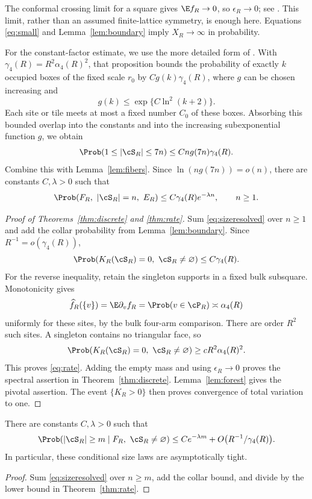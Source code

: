 The conformal crossing limit for a square gives $\E f_R\to0$, so $\epsilon_R\to0$; see \cite{Smirnov}. This limit, rather than an assumed finite-lattice symmetry, is enough here. Equations \eqref{eq:small} and Lemma~\ref{lem:boundary} imply $X_R\to\infty$ in probability.

For the constant-factor estimate, we use the more detailed form of \cite[Proposition~4.1]{GPS}. With $\gamma_4(R)=R^2\alpha_4(R)^2$, that proposition bounds the probability of exactly $k$ occupied boxes of the fixed scale $r_0$ by $C g(k)\gamma_4(R)$, where $g$ can be chosen increasing and
\[
 g(k)\le\exp\{C\ln^2(k+2)\}.
\]
Each site or tile meets at most a fixed number $C_0$ of these boxes. Absorbing this bounded overlap into the constants and into the increasing subexponential function $g$, we obtain
\begin{equation}\label{eq:gpssize}
 \Prob(1\le|\cS_R|\le7n)\le Cn g(7n)\gamma_4(R).
\end{equation}
Combine this with Lemma~\ref{lem:fibers}. Since $\ln(ng(7n))=o(n)$, there are constants $C,\lambda>0$ such that
\begin{equation}\label{eq:sizeresolved}
 \Prob(F_R,\ |\cS_R|=n,\ E_R)
 \le C\gamma_4(R)e^{-\lambda n},\qquad n\ge1.
\end{equation}

\begin{proof}[Proof of Theorems~\ref{thm:discrete} and \ref{thm:rate}]
Sum \eqref{eq:sizeresolved} over $n\ge1$ and add the collar probability from Lemma~\ref{lem:boundary}. Since $R^{-1}=o(\gamma_4(R))$,
\[
 \Prob(K_R(\cS_R)=0,\ \cS_R\ne\varnothing)\le C\gamma_4(R).
\]
For the reverse inequality, retain the singleton supports in a fixed bulk subsquare. Monotonicity gives
\[
 \widehat f_R(\{v\})=\E\partial_vf_R
 =\Prob(v\in\cP_R)\asymp\alpha_4(R)
\]
uniformly for these sites, by the bulk four-arm comparison. There are order $R^2$ such sites. A singleton contains no triangular face, so
\[
 \Prob(K_R(\cS_R)=0,\ \cS_R\ne\varnothing)
 \ge c R^2\alpha_4(R)^2.
\]
This proves \eqref{eq:rate}. Adding the empty mass and using $\epsilon_R\to0$ proves the spectral assertion in Theorem~\ref{thm:discrete}. Lemma~\ref{lem:forest} gives the pivotal assertion. The event $\{K_R>0\}$ then proves convergence of total variation to one.
\end{proof}

\begin{corollary}\label{cor:conditionalsize}
There are constants $C,\lambda>0$ such that
\[
 \Prob(|\cS_R|\ge m\mid F_R,\ \cS_R\ne\varnothing)
 \le C e^{-\lambda m}+O\bigl(R^{-1}/\gamma_4(R)\bigr).
\]
In particular, these conditional size laws are asymptotically tight.
\end{corollary}
\begin{proof}
Sum \eqref{eq:sizeresolved} over $n\ge m$, add the collar bound, and divide by the lower bound in Theorem~\ref{thm:rate}.
\end{proof}

